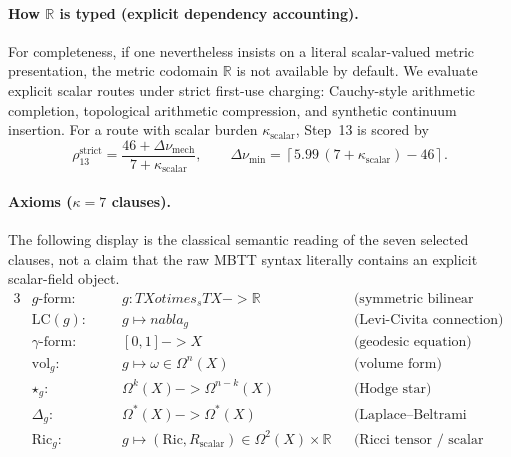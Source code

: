 \documentclass[11pt,a4paper]{article}
\def\to{->}%
\def\otimes{otimes}%
\def\nabla{nabla}%
\theoremstyle{plain}
\theoremstyle{definition}
\theoremstyle{remark}
\newcommand{\R}{\mathbb{R}}
\begin{document}
\paragraph{How $\R$ is typed (explicit dependency accounting).}
For completeness, if one nevertheless insists on a literal scalar-valued metric presentation, the metric codomain $\R$ is not available by default.
We evaluate explicit scalar routes under strict first-use charging: Cauchy-style arithmetic completion, topological arithmetic compression, and synthetic continuum insertion.
For a route with scalar burden $\kappa_{\mathrm{scalar}}$, Step~13 is scored by
\[
  \rho_{13}^{\mathrm{strict}} = \frac{46 + \Delta \nu_{\mathrm{mech}}}{7 + \kappa_{\mathrm{scalar}}},
  \qquad
  \Delta \nu_{\min} = \left\lceil 5.99\,(7+\kappa_{\mathrm{scalar}})-46\right\rceil.
\]

\paragraph{Axioms ($\kappa = 7$ clauses).}
The following display is the classical semantic reading of the seven selected clauses, not a claim that the raw MBTT syntax literally contains an explicit scalar-field object.
\begin{alignat*}{3}
    &g\text{-form:}           &\quad& g : TX \otimes_s TX \to \R
        && \text{(symmetric bilinear form)} \\
    &\mathrm{LC}(g)\text{:}  && g \mapsto \nabla_g
        && \text{(Levi-Civita connection)} \\
    &\gamma\text{-form:}     && [0,1] \to X
        && \text{(geodesic equation)} \\
    &\mathrm{vol}_g\text{:}  && g \mapsto \omega \in \Omega^n(X)
        && \text{(volume form)} \\
    &\star_g\text{:}          && \Omega^k(X) \to \Omega^{n-k}(X)
        && \text{(Hodge star)} \\
    &\Delta_g\text{:}         && \Omega^*(X) \to \Omega^*(X)
        && \text{(Laplace--Beltrami operator)} \\
    &\mathrm{Ric}_g\text{:}  && g \mapsto (\mathrm{Ric}, R_{\mathrm{scalar}}) \in \Omega^2(X) \times \R
        && \text{(Ricci tensor / scalar curvature)}
\end{alignat*}
\end{document}

